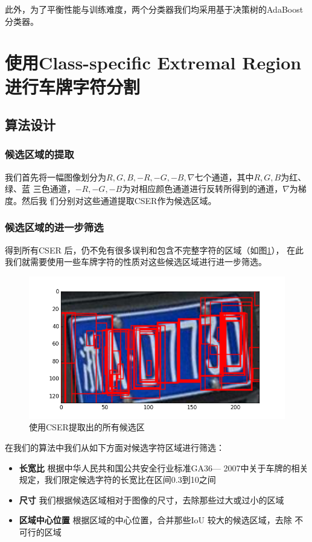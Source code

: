 此外，为了平衡性能与训练难度，两个分类器我们均采用基于决策树的AdaBoost分类器。

\section{使用Class-specific Extremal Region进行车牌字符分割}

\subsection{算法设计}

\subsubsection{候选区域的提取}

我们首先将一幅图像划分为$R,G,B,-R,-G,-B,\nabla$七个通道，其中$R,G,B$为红、绿、蓝
三色通道，$-R,-G,-B$为对相应颜色通道进行反转所得到的通道，$\nabla$为梯度。然后我
们分别对这些通道提取CSER作为候选区域。

\subsubsection{候选区域的进一步筛选}

得到所有CSER 后，仍不免有很多误判和包含不完整字符的区域（如图\ref{Fig:AllERs}），
在此我们就需要使用一些车牌字符的性质对这些候选区域进行进一步筛选。

\begin{figure}[ht]
  \centering
  \includegraphics[width=1.0\linewidth]{./Figure/AllERs.png}
  \caption{使用CSER提取出的所有候选区}\label{Fig:AllERs}
\end{figure}

在我们的算法中我们从如下方面对候选字符区域进行筛选：

\begin{itemize}
\item \textbf{长宽比} 根据中华人民共和国公共安全行业标准GA36— 2007中关于车牌的相关
  规定，我们限定候选字符的长宽比在区间0.3到10之间
\item \textbf{尺寸} 我们根据候选区域相对于图像的尺寸，去除那些过大或过小的区域
\item \textbf{区域中心位置} 根据区域的中心位置，合并那些IoU 较大的候选区域，去除
  不可行的区域
\end{itemize} 

